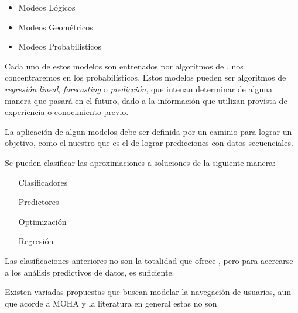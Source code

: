 \begin{itemize}
 \item Modeos Lógicos
 \item Modeos Geométricos
 \item Modeos Probabilisticos
\end{itemize} 


Cada uno de estos modelos son entrenados por algoritmos de \machinelearning, nos concentraremos en los probabilísticos. Estos modelos pueden ser algoritmos de \emph{regresión lineal}, \emph{forecasting} o \emph{predicción}, que intenan determinar de alguna manera que pasará en el futuro, dado a la información que utilizan provista de experiencia o conocimiento previo.


La aplicación de algun modelos debe ser definida por un caminio para lograr un objetivo, como el nuestro que es el de lograr predicciones con datos secuenciales. 





Se pueden clasificar las aproximaciones a soluciones de la siguiente manera:

\begin{itemize}
	
	\item[Clasificadores]	
		
	\item[Predictores]		
		
	\item[Optimización]	
		
	\item[Regresión]
		

\end{itemize}

Las clasificaciones anteriores no son la totalidad que ofrece \machinelearning, pero para acercarse a los análisis predictivos de datos, es suficiente.








Existen variadas propuestas que buscan modelar la navegación de usuarios, aun que acorde a MOHA y la literatura en general estas no son \online











